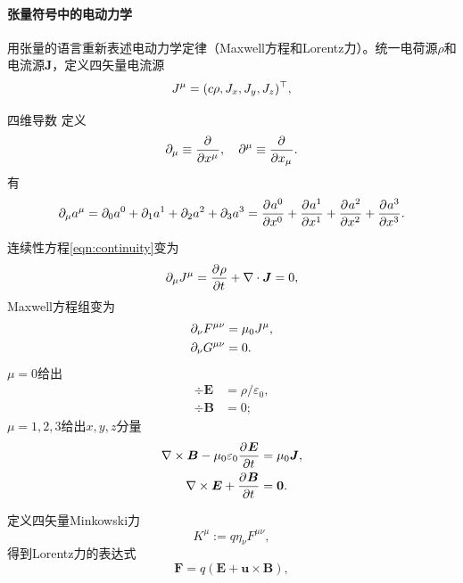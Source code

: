 \paragraph{张量符号中的电动力学}
用张量的语言重新表述电动力学定律（Maxwell方程和Lorentz力）。统一电荷源$\rho$和电流源$\bm J$，定义四矢量电流源
\begin{equation}
    J^\mu = (c\rho,J_x,J_y,J_z)^\top,
\end{equation}
\begin{definition}{四维导数}{}
    定义 
    \begin{equation}
        \partial_\mu \equiv \frac{\partial^{}}{\partial{x^\mu}^{}},\quad\partial^\mu \equiv \frac{\partial^{}}{\partial{x_\mu}^{}}.
    \end{equation}
    有
    \begin{equation}
        \partial_\mu a^\mu = \partial_0a^0 + \partial_1a^1 + \partial_2a^2 + \partial_3a^3 = \frac{\partial^{}a^0}{\partial{x^0}^{}} + \frac{\partial^{}a^1}{\partial{x^1}^{}} + \frac{\partial^{}a^2}{\partial{x^2}^{}} + \frac{\partial^{}a^3}{\partial{x^3}^{}}.
    \end{equation}
\end{definition}
连续性方程\eqref{eqn:continuity}变为 
\begin{equation}
    \label{eq:ed-covariant-continuity}
    \partial_\mu J^\mu = \frac{\partial^{}\rho}{\partial{t}^{}} + \nabla\cdot\bm J = 0,
\end{equation}
Maxwell方程组变为 
\begin{subequations}
    \begin{align}
        \partial_\nu F^{\mu\nu} &= \mu_0J^\mu,\\
        \partial_\nu G^{\mu\nu} &= 0.
    \end{align}
\end{subequations}
$\mu = 0$给出
\begin{subequations}
    \begin{align}
        \div\bm E &= \rho/\varepsilon_0,\\
        \div\bm B &= 0;
    \end{align}
\end{subequations}
$\mu = 1,2,3$给出$x,y,z$分量
\begin{subequations}
    \begin{align}
        \nabla\times\bm B - \mu_0\varepsilon_0\frac{\partial^{}\bm E}{\partial{t}^{}} &= \mu_0\bm J,\\
        \nabla\times\bm E + \frac{\partial^{}\bm B}{\partial{t}^{}} &= \bm0.
    \end{align}
\end{subequations}

定义四矢量Minkowski力 
\begin{equation}
    K^\mu := q\eta_\nu F^{\mu\nu},
\end{equation}
得到Lorentz力的表达式
\[
    \bm F = q(\bm E + \bm u \times \bm B),
\]

